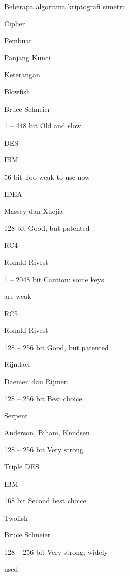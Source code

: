 \documentclass{article}
\begin{document}

Beberapa algoritma kriptografi simetri: 


Cipher 

Pembuat 

Panjang Kunci 

Keterangan 

Blowfish 

Bruce Schneier 

1 – 448  bit Old and slow 

DES 

IBM 

56 bit Too weak to use now 

IDEA 

Massey dan Xuejia 

128 bit Good, but patented 

RC4 

Ronald Rivest 

1 – 2048 bit Caution: some keys 

are weak 

RC5 

Ronald Rivest 

128 – 256 bit Good, but patented 

Rijndael 

Daemen dan Rijmen 

128 – 256 bit Best choice 

Serpent 

Anderson, Biham, Knudsen 

128 – 256 bit Very strong 

Triple DES 

IBM 

168 bit Second best choice 

Twofish 

Bruce Schneier 

128 – 256 bit Very strong; widely 

used
\end{document}
